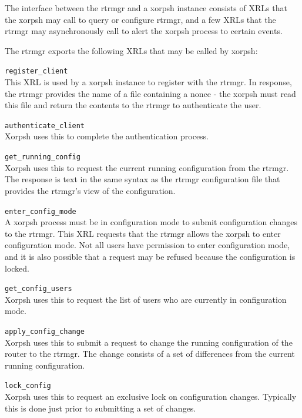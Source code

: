 \documentclass[11pt]{article}
\begin{document}
The interface between the rtrmgr and a xorpsh instance consists of
XRLs that the xorpsh may call to query or configure rtrmgr, and a few
XRLs that the rtrmgr may asynchronously call to alert the xorpsh
process to certain events.

The rtrmgr exports the following XRLs that may be called by xorpsh:

\begin{description}

  \item{\tt register\_client} \\This XRL is used by a xorpsh instance to
register with the rtrmgr.  In response, the rtrmgr provides the name
of a file containing a nonce - the xorpsh must read this file and
return the contents to the rtrmgr to authenticate the user.

  \item{\tt authenticate\_client} \\Xorpsh uses this to complete the
authentication process.

  \item{\tt get\_running\_config} \\Xorpsh uses this to request the
current running configuration from the rtrmgr.  The response is text
in the same syntax as the rtrmgr configuration file that provides the
rtrmgr's view of the configuration.

  \item{\tt enter\_config\_mode} \\A xorpsh process must be in
configuration mode to submit configuration changes to the rtrmgr.
This XRL requests that the rtrmgr allows the xorpsh to enter
configuration mode.  Not all users have permission to enter
configuration mode, and it is also possible that a request may be
refused because the configuration is locked.

  \item{\tt get\_config\_users} \\Xorpsh uses this to request the list of
users who are currently in configuration mode.

  \item{\tt apply\_config\_change} \\Xorpsh uses this to submit a request
to change the running configuration of the router to the rtrmgr.  The
change consists of a set of differences from the current running
configuration.

  \item{\tt lock\_config} \\Xorpsh uses this to request an exclusive
lock on configuration changes.  Typically this is done just prior to
submitting a set of changes.


\end{description}
\end{document}
